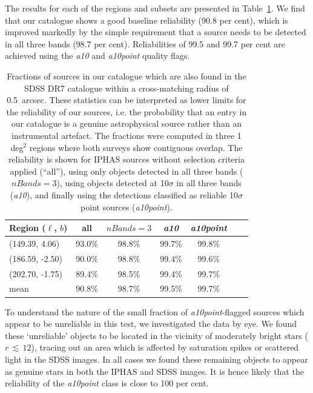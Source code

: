 \documentclass[a4paper,useAMS,usenatbib]{mn2e}
\begin{document}
{The results for each of the regions and subsets
are presented in Table~\ref{tbl:reliability}.
We find that our catalogue shows a good
baseline reliability (90.8 per cent),
which is improved markedly by the simple requirement
that a source needs to be detected in all three bands
(98.7 per cent). 
Reliabilities of 99.5 and 99.7 per cent are achieved
using the \emph{a10} and \emph{a10point} quality flags.

\begin{table}
    \caption{Fractions of sources in our catalogue
             which are also found in the SDSS DR7 catalogue
             within a cross-matching radius of 0.5~arcsec.
             These statistics can be interpreted
             as lower limits
             for the reliability of our sources,
             i.e. the probability that an entry in our
             catalogue is a genuine astrophysical source
             rather than an instrumental artefact.
             The fractions were computed
             in three 1 deg$^2$ regions
             where both surveys
             show contiguous overlap.
             The reliability is shown
             for IPHAS sources 
             without selection criteria applied (``all''),
             using only objects detected in all three bands ($nBands=3$),
             using objects detected at 10$\sigma$
             in all three bands (\emph{a10}),
             and finally using the detections
             classified as reliable 10$\sigma$ point sources (\emph{a10point}).
             }
    \label{tbl:reliability}
    \begin{center}
        \begin{tabular}{lcccccc}
        \toprule
        Region ($\ell$, $b$) & all & $nBands=3$ & \emph{a10} & \emph{a10point} \\
        \midrule
        (149.39, 4.06) & 93.0\% & 98.8\% & 99.7\% & 99.8\% \\
        (186.59, -2.50) & 90.0\% & 98.8\% & 99.4\% & 99.6\% \\
        (202.70, -1.75) & 89.4\% & 98.5\% &99.4\% & 99.7\% \\ \midrule
        mean & 90.8\% & 98.7\% & 99.5\% & 99.7\% \\
        \bottomrule
        \end{tabular}
    \end{center}
\end{table}

To understand the nature of the small fraction
of \emph{a10point}-flagged sources
which appear to be unreliable in this test,
we investigated the data by eye.
We found these `unreliable' objects to be located
in the vicinity of moderately bright stars ($r\,\lesssim\,12$),
tracing out an area which is affected by saturation spikes or
scattered light in the SDSS images.
In all cases we found these remaining objects 
to appear as genuine stars in both the IPHAS and SDSS images.
It is hence likely that the reliability
of the \emph{a10point} class is close to 100 per cent.

}
\end{document}

